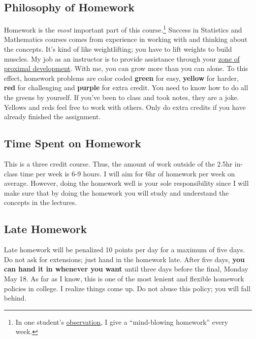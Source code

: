 \documentclass[12pt]{article}
\newcommand{\ingreen}[1]{\color{green}\textbf{#1} \color{black}}
\newcommand{\inyellow}[1]{\color{yellow}\textbf{#1} \color{black}}
\newcommand{\inred}[1]{\color{red}\textbf{#1} \color{black}}
\newcommand{\inpurple}[1]{\color{purple}\textbf{#1} \color{black}}
\newcommand{\qu}[1]{``#1''}
\begin{document}
\subsection*{Philosophy of Homework}


Homework is the \textit{most} important part of this course.\footnote{In one student's \href{http://www.ratemyprofessors.com/ShowRatings.jsp?tid=1951051}{observation}, I give a \qu{mind-blowing homework} every week.} Success in Statistics and Mathematics courses comes from experience in working with and thinking about the concepts. It's kind of like weightlifting; you have to lift weights to build muscles. My job as an instructor is to provide assistance through your \href{http://en.wikipedia.org/wiki/Zone_of_proximal_development}{zone of proximal development}. With me, you can grow more than you can alone. To this effect, homework problems are color coded \ingreen{green} for easy, \inyellow{yellow} for harder, \inred{red} for challenging and \inpurple{purple} for extra credit. You need to know how to do all the greens by yourself. If you've been to class and took notes, they are a joke. Yellows and reds feel free to work with others. Only do extra credits if you have already finished the assignment.

\subsection*{Time Spent on Homework }

This is a three credit course. Thus, the amount of work outside of the 2.5hr in-class time per week is 6-9 hours. I will aim for 6hr of homework per week on average. However, doing the homework well is your sole responsibility since I will make sure that by doing the homework you will study and understand the concepts in the lectures.

\subsection*{Late Homework}

Late homework will be penalized 10 points per day for a maximum of five days. Do not ask for extensions; just hand in the homework late. After five days, \textbf{you can hand it in whenever you want} until three days before the final, Monday May 18. As far as I know, this is one of the most lenient and flexible homework policies in college. I realize things come up. Do not abuse this policy; you will fall behind.
\end{document}
